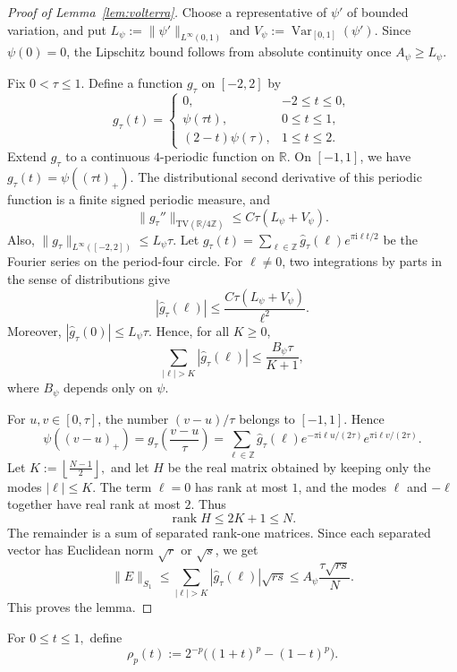 \documentclass[11pt]{article}
\theoremstyle{definition}
\newcommand{\ii}{\mathrm{i}}
\newcommand{\R}{\mathbb R}
\newcommand{\Z}{\mathbb Z}
\begin{document}
\begin{proof}[Proof of Lemma~\ref{lem:volterra}]
Choose a representative of \(\psi'\) of bounded variation, and put
\(
L_\psi:=\|\psi'\|_{L^\infty(0,1)}\) and
\(
V_\psi:=\operatorname{Var}_{[0,1]}(\psi').
\)
Since \(\psi(0)=0\), the Lipschitz bound follows from absolute continuity once
\(A_\psi\ge L_\psi\).

Fix \(0<\tau\le1\). Define a function \(g_\tau\) on \([-2,2]\) by
\[
g_\tau(t)=
\begin{cases}
0,& -2\le t\le0,\\
\psi(\tau t),&0\le t\le1,\\
(2-t)\psi(\tau),&1\le t\le2.
\end{cases}
\]
Extend \(g_\tau\) to a continuous \(4\)-periodic function on \(\R\). On
\([-1,1]\), we have
\(
g_\tau(t)=\psi((\tau t)_+).
\)
The distributional second derivative of this periodic function is a finite
signed periodic measure, and
\[
\|g_\tau''\|_{\mathrm{TV}(\R/4\Z)}
\le
C\tau(L_\psi+V_\psi).
\]
Also,
\(
\|g_\tau\|_{L^\infty([-2,2])}\le L_\psi\tau.
\)
Let
\(
g_\tau(t)=\sum_{\ell\in\Z}\widehat g_\tau(\ell)e^{\pi \ii\ell t/2}
\)
be the Fourier series on the period-four circle. For \(\ell\ne0\), two
integrations by parts in the sense of distributions give
\[
|\widehat g_\tau(\ell)|
\le
\frac{C\tau(L_\psi+V_\psi)}{\ell^2}.
\]
Moreover, \(|\widehat g_\tau(0)|\le L_\psi\tau\). Hence, for all \(K\ge0\),
\[
\sum_{|\ell|>K}|\widehat g_\tau(\ell)|
\le
\frac{B_\psi\tau}{K+1},
\]
where \(B_\psi\) depends only on \(\psi\).

For \(u,v\in[0,\tau]\), the number \((v-u)/\tau\) belongs to \([-1,1]\). Hence
\[
\psi((v-u)_+)
=
g_\tau\left(\frac{v-u}{\tau}\right)
=
\sum_{\ell\in\Z}
\widehat g_\tau(\ell)
e^{-\pi \ii\ell u/(2\tau)}
e^{\pi \ii\ell v/(2\tau)}.
\]
Let
\(
K:=\left\lfloor\frac{N-1}{2}\right\rfloor,
\)
and let \(H\) be the real matrix obtained by keeping only the modes
\(|\ell|\le K\). The term \(\ell=0\) has rank at most \(1\), and the modes
\(\ell\) and \(-\ell\) together have real rank at most \(2\). Thus
\[
\operatorname{rank}H\le2K+1\le N.
\]
The remainder is a sum of separated rank-one matrices. Since each separated
vector has Euclidean norm \(\sqrt r\) or \(\sqrt s\), we get
\[
\|E\|_{S_1}
\le
\sum_{|\ell|>K}|\widehat g_\tau(\ell)|\sqrt{rs}
\le
A_\psi\frac{\tau\sqrt{rs}}{N}.
\]
This proves the lemma.
\end{proof}

For \( 0\le t\le 1,\) define
\[
\rho_p(t):=2^{-p}\bigl((1+t)^p-(1-t)^p\bigr).
\]
\end{document}
